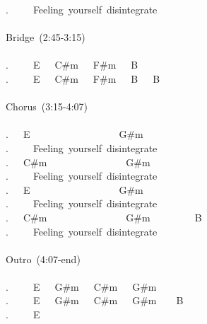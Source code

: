 {.\ \ \ \ \ Feeling\ yourself\ disintegrate\\
\\
Bridge\ (2:45-3:15)\\
\\
.\ \ \ \ \ E\ \ \ C\#m\ \ \ F\#m\ \ \ B\\
.\ \ \ \ \ E\ \ \ C\#m\ \ \ F\#m\ \ \ B\ \ \ B\\
\\
Chorus\ (3:15-4:07)\\
\\
.\ \ \ E\ \ \ \ \ \ \ \ \ \ \ \ \ \ \ \ \ \ G\#m\\
.\ \ \ \ \ Feeling\ yourself\ disintegrate\\
.\ \ \ C\#m\ \ \ \ \ \ \ \ \ \ \ \ \ \ \ \ G\#m\\
.\ \ \ \ \ Feeling\ yourself\ disintegrate\\
.\ \ \ E\ \ \ \ \ \ \ \ \ \ \ \ \ \ \ \ \ \ G\#m\\
.\ \ \ \ \ Feeling\ yourself\ disintegrate\\
.\ \ \ C\#m\ \ \ \ \ \ \ \ \ \ \ \ \ \ \ \ G\#m\ \ \ \ \ \ \ \ \ B\\
.\ \ \ \ \ Feeling\ yourself\ disintegrate\\
\\
Outro\ (4:07-end)\\
\\
.\ \ \ \ \ E\ \ \ G\#m\ \ \ C\#m\ \ \ G\#m\\
.\ \ \ \ \ E\ \ \ G\#m\ \ \ C\#m\ \ \ G\#m\ \ \ \ B\\
.\ \ \ \ \ E}

